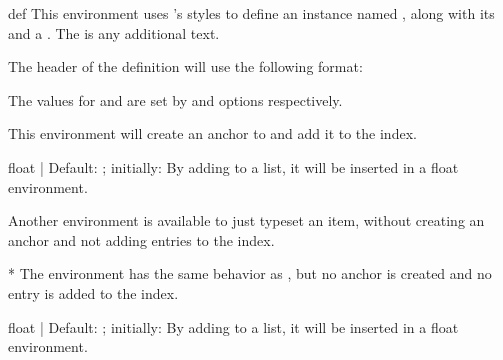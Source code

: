 \documentclass[11pt, outdir = ./out]{article}
\begin{document}
\begin{Environmentenv*}{def}{}{}
    \label{environmentdef}
    This environment uses 's styles to define an instance named , along with its  and a . The  is any additional text.

    The header of the definition will use the following format:


    The values for  and  are set by  and  options respectively.

    This environment will create an anchor to  and add it to the index.
\end{Environmentenv*}


\begin{DocsExample}
    \begin{EnumItemOptiondef}{float}{ | }{Default: ; initially: }
        By adding  to a list, it will be inserted in a float environment.
    \end{EnumItemOptiondef}
\end{DocsExample}

Another environment is available to just typeset an item, without creating an anchor and not adding entries to the index.

\begin{Environmentenv*}{*}{}{}
    The  environment has the same behavior as , but no anchor is created and no entry is added to the index.
\end{Environmentenv*}

\begin{DocsExample}
    \begin{EnumItemOption*}{float}{ | }{Default: ; initially: }
        By adding  to a list, it will be inserted in a float environment.
    \end{EnumItemOption*}
\end{DocsExample}
\end{document}
